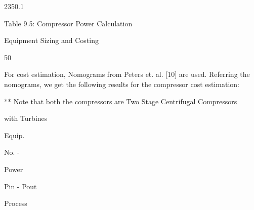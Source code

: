 \documentclass[a4paper,portrait,12pt]{article}
\begin{document}
2350.1





\begin{flushleft}
Table 9.5: Compressor Power Calculation
\end{flushleft}





\begin{flushleft}
\newpage
Equipment Sizing and Costing
\end{flushleft}





50





\begin{flushleft}
For cost estimation, Nomograms from Peters et. al. [10] are used. Referring the nomograms, we get the following results for the compressor cost estimation:
\end{flushleft}


\begin{flushleft}
** Note that both the compressors are Two Stage Centrifugal Compressors
\end{flushleft}


\begin{flushleft}
with Turbines
\end{flushleft}





\begin{flushleft}
Equip.
\end{flushleft}


\begin{flushleft}
No. -
\end{flushleft}





\begin{flushleft}
Power
\end{flushleft}


\begin{flushleft}
Pin - Pout
\end{flushleft}





\begin{flushleft}
Process
\end{flushleft}
\end{document}
